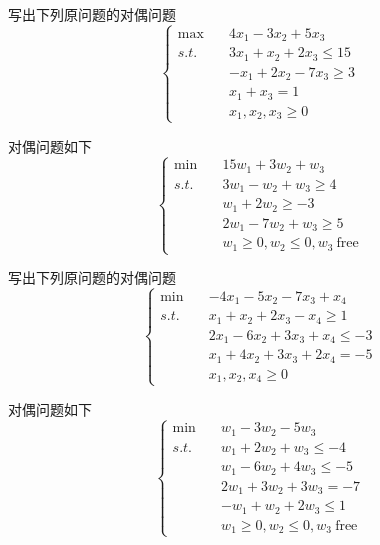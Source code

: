 

\newcommand\Title{最优化方法第6次作业}




\begin{problem}
    写出下列原问题的对偶问题
    \[\begin{cases}
        \max \quad &4x_1 - 3x_2 + 5x_3 \\
        s.t. \quad &3x_1 + x_2 + 2x_3 \le 15\\
        &-x_1 + 2x_2 - 7x_3 \ge 3\\
        &x_1 + x_3 = 1\\
        &x_1, x_2, x_3 \ge 0
    \end{cases}\]
\end{problem}
\begin{solution}
    对偶问题如下
    \[\begin{cases}
        \min \quad &15w_1 + 3w_2 + w_3\\
        s.t. \quad &3w_1 - w_2 + w_3 \ge 4\\
        &w_1 + 2w_2 \ge -3\\
        &2w_1 - 7w_2 + w_3 \ge 5\\
        &w_1 \ge 0, w_2 \le 0, w_3\ \text{free}
    \end{cases}\]
\end{solution}

\begin{problem}
    写出下列原问题的对偶问题
    \[\begin{cases}
        \min \quad &-4x_1 - 5x_2 - 7x_3 + x_4 \\
        s.t. \quad &x_1 + x_2 + 2x_3 - x_4 \ge 1\\
        &2x_1 - 6x_2 + 3x_3 + x_4 \le -3\\
        &x_1 + 4x_2 + 3x_3 + 2x_4 = -5\\
        &x_1, x_2, x_4 \ge 0
    \end{cases}\]
\end{problem}
\begin{solution}
    对偶问题如下
    \[\begin{cases}
        \min \quad &w_1 - 3w_2 - 5w_3\\
        s.t. \quad &w_1 + 2w_2 + w_3 \le -4\\
        &w_1 - 6w_2 + 4w_3 \le -5\\
        &2w_1 + 3w_2 + 3w_3 = -7\\
        &-w_1 + w_2 + 2w_3 \le 1\\
        &w_1 \ge 0, w_2 \le 0, w_3 \ \text{free}
    \end{cases}\]
\end{solution}

